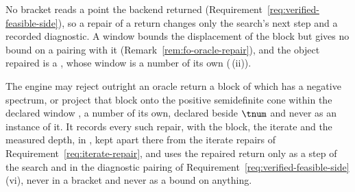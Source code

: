 
No bracket reads a point the backend returned
(Requirement~\ref{req:verified-feasible-side}), so a repair of a return
changes only the search's next step and a recorded diagnostic. A window
bounds the displacement of the block but gives no bound on a pairing with
it (Remark~\ref{rem:fo-oracle-repair}), and the object repaired is a
, whose window is a number of its own
(\,(ii)).

\begin{requirement}\label{req:oracle-repair}
The engine may reject outright an oracle return a block of which has a
negative spectrum, or project that block onto the positive semidefinite cone
within the declared window , a number of its own,
declared beside $\tnum$ and never as an instance of it. It records every
such repair, with the block, the iterate and the measured depth, in
, kept apart there from the iterate repairs of
Requirement~\ref{req:iterate-repair}, and uses the repaired return only as
a step of the search and in the diagnostic pairing of
Requirement~\ref{req:verified-feasible-side}\,(vi), never in a bracket and
never as a bound on anything.
\end{requirement}
